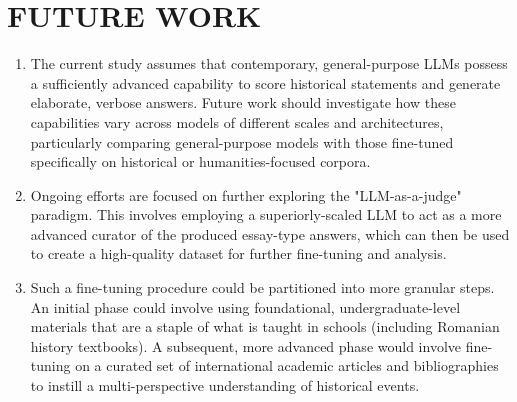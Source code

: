\documentclass[11pt]{article}
\begin{document}
\section{\MakeUppercase{Future Work}}
\begin{enumerate}[label=\Alph*.]
\item The current study assumes that contemporary, general-purpose LLMs possess a sufficiently advanced capability to score historical statements and generate elaborate, verbose answers. Future work should investigate how these capabilities vary across models of different scales and architectures, particularly comparing general-purpose models with those fine-tuned specifically on historical or humanities-focused corpora.
\item Ongoing efforts are focused on further exploring the "LLM-as-a-judge" paradigm. This involves employing a superiorly-scaled LLM to act as a more advanced curator of the produced essay-type answers, which can then be used to create a high-quality dataset for further fine-tuning and analysis.
\item Such a fine-tuning procedure could be partitioned into more granular steps. An initial phase could involve using foundational, undergraduate-level materials that are a staple of what is taught in schools (including Romanian history textbooks). A subsequent, more advanced phase would involve fine-tuning on a curated set of international academic articles and bibliographies to instill a multi-perspective understanding of historical events.
\end{enumerate}

\newpage
\end{document}
